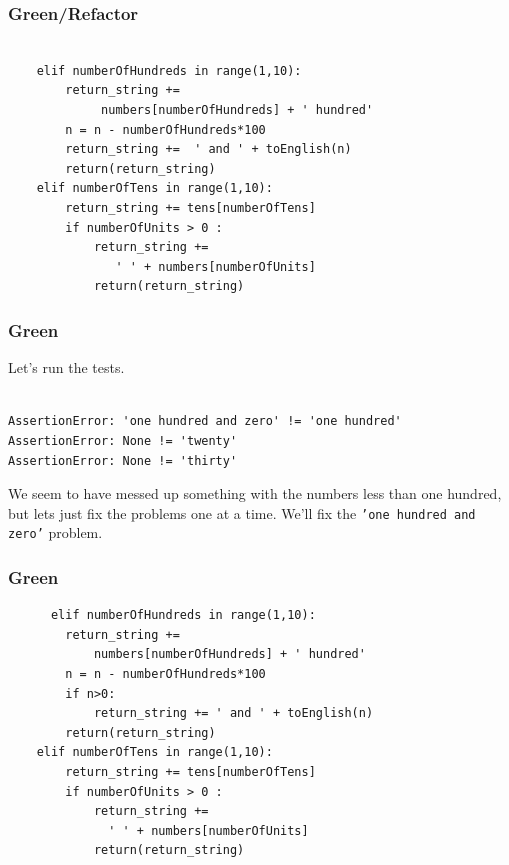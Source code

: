 \documentclass{beamer}
\begin{document}
\begin{frame}[fragile]
  \frametitle{Green/Refactor}
\begin{lstlisting}

    elif numberOfHundreds in range(1,10):
        return_string += 
             numbers[numberOfHundreds] + ' hundred'
        n = n - numberOfHundreds*100
        return_string +=  ' and ' + toEnglish(n)
        return(return_string)
    elif numberOfTens in range(1,10):
        return_string += tens[numberOfTens]
        if numberOfUnits > 0 :
            return_string += 
               ' ' + numbers[numberOfUnits]
            return(return_string)
  \end{lstlisting}
\end{frame}

\begin{frame}[fragile]
\frametitle{Green}
Let's run the tests.
\begin{verbatim}

AssertionError: 'one hundred and zero' != 'one hundred'
AssertionError: None != 'twenty'
AssertionError: None != 'thirty'
\end{verbatim}
We seem to have messed up something with the numbers less than one
hundred, but lets just fix the problems one at a time. We'll fix the
{\tt 'one hundred and zero'} problem.
\end{frame}
%
\begin{frame}[fragile]
\frametitle{Green}

\begin{lstlisting}
      elif numberOfHundreds in range(1,10):
        return_string += 
            numbers[numberOfHundreds] + ' hundred'
        n = n - numberOfHundreds*100
        if n>0:
            return_string += ' and ' + toEnglish(n)
        return(return_string)
    elif numberOfTens in range(1,10):
        return_string += tens[numberOfTens]
        if numberOfUnits > 0 :
            return_string += 
              ' ' + numbers[numberOfUnits]
            return(return_string)
\end{lstlisting}
\end{frame}
\end{document}
